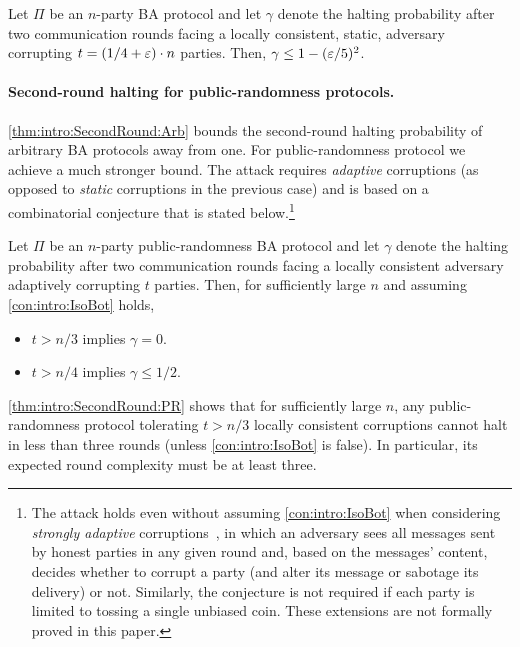 \begin{theorem}\label{thm:intro:SecondRound:Arb}
Let $\Pi$ be an $n$-party BA protocol and let $\gamma$ denote the halting probability after two communication rounds facing a locally consistent, static, adversary corrupting $t=(1/4+\varepsilon)\cdot n$ parties.
Then, $\gamma \le 1 - (\varepsilon /5)^2$.
\end{theorem}

\paragraph{Second-round halting for public-randomness protocols.}
\cref{thm:intro:SecondRound:Arb} bounds the second-round halting probability of arbitrary BA protocols away from one. For public-randomness protocol we achieve a much stronger bound. The attack requires \emph{adaptive} corruptions (as opposed to \emph{static} corruptions in the previous case) and is based on a combinatorial conjecture that is stated below.\footnote{The attack holds even without assuming \cref{con:intro:IsoBot} when considering \emph{strongly adaptive} corruptions~\cite{GKP15}, in which an adversary sees all messages sent by honest parties in any given round and, based on the messages' content, decides whether to corrupt a party (and alter its message or sabotage its delivery) or not. Similarly, the conjecture is not required if each party is limited to tossing a single unbiased coin. These extensions are not formally proved in this paper.\label{footnote:no_conjecture}}

\begin{theorem}\label{thm:intro:SecondRound:PR}
Let $\Pi$ be an $n$-party public-randomness BA protocol and let $\gamma$ denote the halting probability after two communication rounds facing a locally consistent adversary adaptively corrupting $t$ parties.
Then, for sufficiently large $n$ and assuming \cref{con:intro:IsoBot} holds,
\begin{itemize}
\item $t > n/3$ implies $\gamma=0$.
\item $t > n/4$ implies $\gamma \leq 1/2$.
\end{itemize}
\end{theorem}

\cref{thm:intro:SecondRound:PR} shows that for sufficiently large $n$, any public-randomness protocol tolerating $t>n/3$ locally consistent corruptions cannot halt in less than three rounds (unless \cref{con:intro:IsoBot} is false). In particular, its expected round complexity must be at least three.

